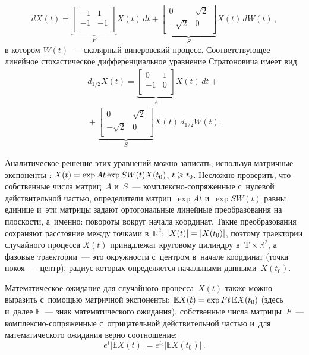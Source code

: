 \begin{multicols}{2}
\noindent
$$
  dX(t) = \underbrace{\left[ \begin{array}{cc}
    -1 & 1 \\
    -1 & -1 \\
  \end{array} \right]}_F X(t) \, dt 
  +
  \underbrace{\left[ \begin{array}{cc}
    0 & \sqrt 2 \\
    -\sqrt 2 & 0 \\
  \end{array} \right]}_S X(t) \, dW(t)\,,
$$
в котором $W(t)$~--- скалярный винеровский процесс. 
Соответствующее линейное стохастическое дифференциальное 
уравнение Стратоновича имеет вид:
\begin{multline*}
  d_{1/2} X(t) = \underbrace{\left[ \begin{array}{cc}
    0 & 1 \\
    -1 & 0 \\
  \end{array} \right]}_A X(t) \, dt +{}\\
  {}+
  \underbrace{\left[ \begin{array}{cc}
    0 & \sqrt 2 \\
    -\sqrt 2 & 0 \\
  \end{array} \right]}_S X(t) \, d_{1/2} W(t).
\end{multline*}

Аналитическое решение этих уравнений можно записать, 
используя матричные экспоненты \cite{Ave_ACMMENSP17}: 
$X(t) \hm= \exp{At} \exp{SW(t)}  X(t_0)$, $t\hm \geqslant t_0$. 
Несложно проверить, что собственные числа матриц~$A$ и~$S$~--- 
комп\-лекс\-но-со\-пря\-жен\-ные с~нулевой действительной частью, определители 
матриц~$\exp{At}$ и~$\exp{SW(t)}$ равны единице и~эти матрицы задают 
ортогональные линейные преобразования на плоскости, а~именно: повороты 
вокруг начала координат. Такие преобразования сохраняют расстояние между 
точками в~$\mathds{R}^2$: $|X(t)| \hm= |X(t_0)|$, поэтому 
траектории случайного процесса $X(t)$ принадлежат круговому цилиндру в~$\mathrm{T} \times \mathds{R}^2$, а фазовые траектории~--- это окружности 
с~цент\-ром в~начале координат (точка покоя~--- центр), радиус 
которых определяется начальными данными~$X(t_0)$.

Математическое ожидание для случайного процесса~$X(t)$ 
также можно выразить с~помощью мат\-рич\-ной экспоненты: $\mathbb{E} X(t) 
\hm= \exp{Ft} \, \mathbb{E} X(t_0)$ (здесь и~далее $\mathbb{E}$~--- 
знак математического ожидания), собственные числа матрицы~$F$~--- комп\-лекс\-но-со\-пря\-жен\-ные 
с~отрицательной действительной частью и~для математического ожидания 
верно соотношение:
$$
{e}^t |\mathbb{E} X(t)|
 ={e}^{t_0} \left\vert \mathbb{E} X(t_0)\right\vert \,. 
 $$


\end{multicols}
